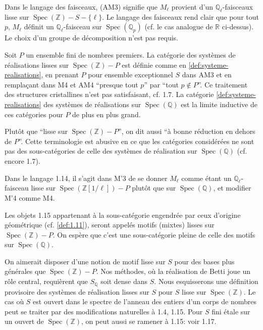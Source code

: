 \documentclass[12pt,a4paper]{article}
\theoremstyle{plain}
\theoremstyle{definition}
\theoremstyle{remark}
\DeclareMathOperator{\Spec}{Spec}
\providecommand{\Spec}{\operatorname{Spec}}
\begin{document}
Dans le langage des faisceaux, (AM3) signifie que $M_\ell$ provient d'un
$\mathbb{Q}_\ell$-faisceaux lisse sur $\Spec(\mathbb{Z}) - S - \{\ell\}$. Le langage des
faisceaux rend clair que pour tout $p$, $M_\ell$ d\'efinit un
$\mathbb{Q}_\ell$-faisceau sur $\Spec(\mathbb{Q}_p)$ (cf. le cas analogue de
$\mathbb{R}$ ci-dessus). Le choix d'un groupe de d\'ecomposition n'est pas requis.

\begin{variante}[1.15]
Soit $P$ un ensemble fini de nombres premiers. La cat\'egorie des syst\`emes de
r\'ealisations lisses sur $\Spec(\mathbb{Z}) - P$ est d\'efinie comme en
\ref{def:systeme-realisations}, en prenant $P$ pour ensemble exceptionnel $S$ dans AM3 et
en rempla\c{c}ant dans M4 et AM4 ``presque tout $p$'' par ``tout $p \notin P$''. Ce
traitement des structures cristallines n'est pas satisfaisant, cf. 1.7. La cat\'egorie
\ref{def:systeme-realisations} des syst\`emes de r\'ealisations sur $\Spec(\mathbb{Q})$
est la limite inductive de ces cat\'egories pour $P$ de plus en plus grand.

Plut\^ot que ``lisse sur $\Spec(\mathbb{Z}) - P$'', on dit aussi ``\`a bonne r\'eduction
en dehors de $P$''. Cette terminologie est abusive en ce que les cat\'egories consid\'er\'ees
ne sont pas des sous-cat\'egories de celle des syst\`emes de r\'ealisation sur
$\Spec(\mathbb{Q})$ (cf. encore 1.7).
\end{variante}

Dans le langage 1.14, il s'agit dans M'3 de se donner $M_\ell$ comme \'etant un
$\mathbb{Q}_\ell$-faisceau lisse sur $\Spec(\mathbb{Z}[1/\ell]) - P$ plut\^ot que sur
$\Spec(\mathbb{Q})$, et modifier M'4 comme M4.

Les objets 1.15 appartenant \`a la sous-cat\'egorie engendr\'ee par ceux d'origine
g\'eom\'etrique (cf. \ref{def:1.11}), seront appel\'es motifs (mixtes) lisses sur
$\Spec(\mathbb{Z}) - P$. On esp\`ere que c'est une sous-cat\'egorie pleine de celle des
motifs sur $\Spec(\mathbb{Q})$.

On aimerait disposer d'une notion de motif lisse sur $S$ pour des bases plus g\'en\'erales
que $\Spec(\mathbb{Z}) - P$. Nos m\'ethodes, o\`u la r\'ealisation de Betti joue un r\^ole
central, requi\`erent que $S_\mathbb{Q}$ soit dense dans $S$. Nous esquisserons une
d\'efinition provisoire des syst\`emes de r\'ealisation lisses sur $S$ pour $S$ lisse sur
$\Spec(\mathbb{Z})$. Le cas o\`u $S$ est ouvert dans le spectre de l'anneau des entiers
d'un corps de nombres peut se traiter par des modifications naturelles \`a 1.4, 1.15. Pour
$S$ fini \'etale sur un ouvert de $\Spec(\mathbb{Z})$, on peut aussi se ramener \`a 1.15:
voir 1.17.
\end{document}
